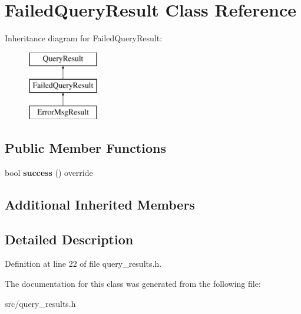 \hypertarget{class_failed_query_result}{}\section{Failed\+Query\+Result Class Reference}
\label{class_failed_query_result}
Inheritance diagram for Failed\+Query\+Result\+:\begin{figure}[H]
\begin{center}
\leavevmode
\includegraphics[height=3.000000cm]{class_failed_query_result}
\end{center}
\end{figure}
\subsection*{Public Member Functions}
\begin{DoxyCompactItemize}
\item 
\mbox{\label{class_failed_query_result_a4e742c22aa57a13cca1cfb3b3b05f63d}} 
bool {\bfseries success} () override
\end{DoxyCompactItemize}
\subsection*{Additional Inherited Members}


\subsection{Detailed Description}


Definition at line 22 of file query\+\_\+results.\+h.



The documentation for this class was generated from the following file\+:\begin{DoxyCompactItemize}
\item 
src/query\+\_\+results.\+h\end{DoxyCompactItemize}
